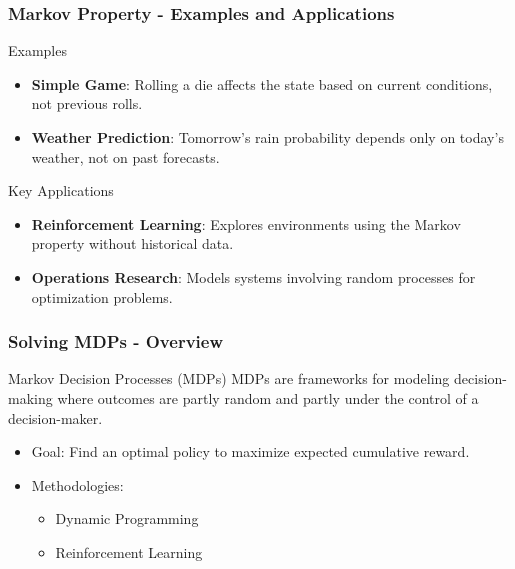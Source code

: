 \documentclass[aspectratio=169]{beamer}
\begin{document}
\begin{frame}[fragile]
    \frametitle{Markov Property - Examples and Applications}
    \begin{block}{Examples}
        \begin{itemize}
            \item \textbf{Simple Game}:
            Rolling a die affects the state based on current conditions, not previous rolls.
            \item \textbf{Weather Prediction}:
            Tomorrow’s rain probability depends only on today's weather, not on past forecasts.
        \end{itemize}
    \end{block}

    \begin{block}{Key Applications}
        \begin{itemize}
            \item \textbf{Reinforcement Learning}:
            Explores environments using the Markov property without historical data.
            \item \textbf{Operations Research}:
            Models systems involving random processes for optimization problems.
        \end{itemize}
    \end{block}
\end{frame}

\begin{frame}[fragile]
    \frametitle{Solving MDPs - Overview}
    \begin{block}{Markov Decision Processes (MDPs)}
        MDPs are frameworks for modeling decision-making where outcomes are partly random and partly under the control of a decision-maker.
    \end{block}
    \begin{itemize}
        \item Goal: Find an optimal policy to maximize expected cumulative reward.
        \item Methodologies:
            \begin{itemize}
                \item Dynamic Programming
                \item Reinforcement Learning
            \end{itemize}
    \end{itemize}
\end{frame}
\end{document}
